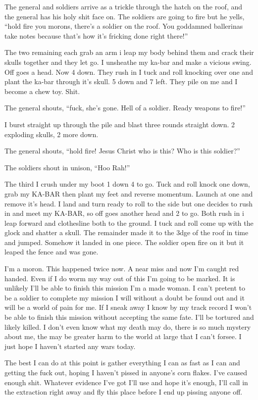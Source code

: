 The general and soldiers arrive as a trickle through the hatch on the roof, and the general has his holy shit face on. The soldiers are going to fire but he yells, ``hold fire you morons, there's a soldier on the roof. You goddamned ballerinas take notes because that's how it's fricking done right there!''

The two remaining each grab an arm i leap my body behind them and crack their skulls together and they let go. I unsheathe my ka-bar and make a vicious swing. Off goes a head. Now 4 down. They rush in I tuck and roll knocking over one and plant the ka-bar through it's skull. 5 down and 7 left. They pile on me and I become a chew toy. Shit.

The general shouts, ``fuck, she's gone. Hell of a soldier. Ready weapons to fire!''

I burst straight up through the pile and blast three rounds straight down. 2 exploding skulls, 2 more down.

The general shouts, ``hold fire! Jesus Christ who is this? Who is this soldier?''

The soldiers shout in unison, ``Hoo Rah!''

The third I crush under my boot 1 down 4 to go. Tuck and roll knock one down, grab my KA-BAR then plant my feet and reverse momentum. Launch at one and remove it's head. I land and turn ready to roll to the side but one decides to rush in and meet my KA-BAR, so off goes another head and 2 to go. Both rush in i leap forward and clothesline both to the ground. I tuck and roll come up with the glock and shatter a skull. The remainder made it to the 3dge of the roof in time and jumped. Somehow it landed in one piece. The soldier open fire on it but it leaped the fence and was gone.

I'm a moron. This happened twice now. A near miss and now I'm caught red handed. Even if I do worm my way out of this I'm going to be marked. It is unlikely I'll be able to finish this mission I'm a made woman. I can't pretent to be a soldier to complete my mission I will without a doubt be found out and it will be a world of pain for me. If I sneak away I know by my track record I won't be able to finish this mission without accepting the same fate. I'll be tortured and likely killed. I don't even know what my death may do, there is so much mystery about me, the may be greater harm to the world at large that I can't forsee. I just hope I haven't started any wars today.

The best I can do at this point is gather everything I can as fast as I can and getting the fuck out, hoping I haven't pissed in anyone's corn flakes. I've caused enough shit. Whatever evidence I've got I'll use and hope it's enough, I'll call in the extraction right away and fly this place before I end up pissing anyone off.

